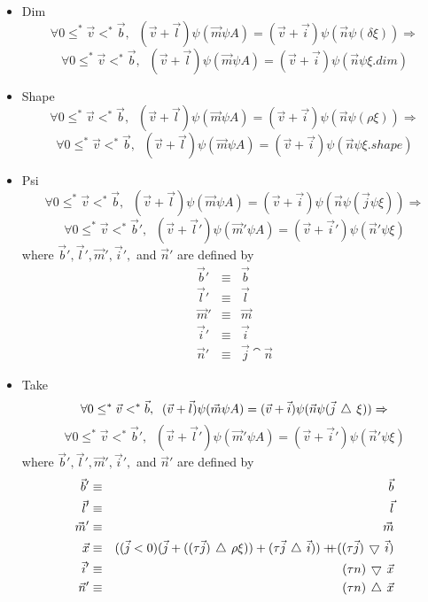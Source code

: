  
\begin{itemize}
\item{Dim}
$$\forall 0\leq^{*}\vec{v}<^{*}\vec{b}, \;\;(\vec{v}+\vec{l})\psi(\vec{m}\psi 
	A)=(\vec{v}+\vec{i})\psi(\vec{n}\psi (\delta\xi))\Rightarrow$$
$$
\forall 0\leq^{*}\vec{v}<^{*}\vec{b}, \;\;(\vec{v}+\vec{l})\psi(\vec{m}\psi A)=
(\vec{v}+\vec{i})\psi(\vec{n}\psi \xi.dim)$$
 
\item{Shape}
$$\forall 0\leq^{*}\vec{v}<^{*}\vec{b}, \;\;(\vec{v}+\vec{l})\psi(\vec{m}\psi
	A)=(\vec{v}+\vec{i})\psi(\vec{n}\psi (\rho\xi))\Rightarrow$$
$$\forall 0\leq^{*}\vec{v}<^{*}\vec{b}, \;\;(\vec{v}+\vec{l})\psi(\vec{m} \psi
	A)=(\vec{v}+\vec{i})\psi(\vec{n}\psi \xi.shape)$$
 
\item{Psi}
$$\forall 0\leq^{*}\vec{v}<^{*}\vec{b}, \;\;(\vec{v}+\vec{l})\psi(\vec{m}\psi 
	A)=(\vec{v}+\vec{i})\psi(\vec{n}\psi(\vec{j}\psi\xi))\Rightarrow$$
$$\forall 0\leq^{*}\vec{v}<^{*}\vec{b}', \;\;(\vec{v}+\vec{l}')\psi(\vec{m}'
	\psi A)=(\vec{v}+\vec{i}')\psi(\vec{n}'\psi\xi)$$
where $\vec{b}', \vec{l}', \vec{m}', \vec{i}',$ and $\vec{n}'$ are defined by
\begin{eqnarray*}
\vec{b}' & \equiv & \vec{b} \\
\vec{l}' & \equiv & \vec{l} \\
\vec{m}' & \equiv & \vec{m} \\
\vec{i}' & \equiv & \vec{i} \\
\vec{n}' & \equiv & \vec{j}\cat\vec{n}
\end{eqnarray*}
 
\item{Take}
$$\forall 0\leq^{*}\vec{v}<^{*}\vec{b}, \;\;(\vec{v}+\vec{l})\psi(\vec{m}\psi 
	A)=(\vec{v}+\vec{i})\psi(\vec{n}\psi(\vec{j}\,\bigtriangleup\,\xi))\Rightarrow$$
$$\forall 0\leq^{*}\vec{v}<^{*}\vec{b}', \;\;(\vec{v}+\vec{l}')\psi(\vec{m}'
	\psi A)=(\vec{v}+\vec{i}')\psi(\vec{n}'\psi\xi)$$
where $\vec{b}', \vec{l}', \vec{m}', \vec{i}',$ and $\vec{n}'$ are defined by
\begin{eqnarray*}
\vec{b}' & \equiv & \vec{b} \\
\vec{l}' & \equiv & \vec{l} \\
\vec{m}' & \equiv & \vec{m} \\
\vec{x} & \equiv & ((\vec{j}<0)(\vec{j}+((\tau\vec{j})\,\bigtriangleup\,\rho\xi))+
	(\tau\vec{j}\,\bigtriangleup\,\vec{i}))+\!\!\!\!+ ((\tau\vec{j})\,\bigtriangledown\,\vec{i}) \\
\vec{i}' & \equiv & (\tau n)\,\bigtriangledown\,\vec{x} \\
\vec{n}' & \equiv & (\tau n)\,\bigtriangleup\,\vec{x}
\end{eqnarray*}
 

\end{itemize}
